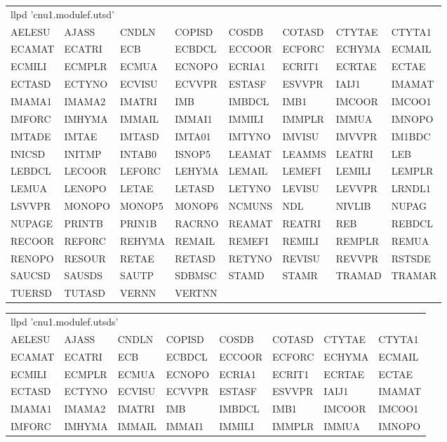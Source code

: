 {\tiny\ttfamily
\noindent\begin{tabular}{@{}llllllll@{}}
\multicolumn{8}{l}{llpd 'cnu1.modulef.utsd'}\\
AELESU & AJASS & CNDLN & COPISD & COSDB & COTASD & CTYTAE & CTYTA1\\
ECAMAT & ECATRI & ECB & ECBDCL & ECCOOR & ECFORC & ECHYMA & ECMAIL\\
ECMILI & ECMPLR & ECMUA & ECNOPO & ECRIA1 & ECRIT1 & ECRTAE & ECTAE\\
ECTASD & ECTYNO & ECVISU & ECVVPR & ESTASF & ESVVPR & IAIJ1 & IMAMAT\\
IMAMA1 & IMAMA2 & IMATRI & IMB & IMBDCL & IMB1 & IMCOOR & IMCOO1\\
IMFORC & IMHYMA & IMMAIL & IMMAI1 & IMMILI & IMMPLR & IMMUA & IMNOPO\\
IMTADE & IMTAE & IMTASD & IMTA01 & IMTYNO & IMVISU & IMVVPR & IM1BDC\\
INICSD & INITMP & INTAB0 & ISNOP5 & LEAMAT & LEAMMS & LEATRI & LEB\\
LEBDCL & LECOOR & LEFORC & LEHYMA & LEMAIL & LEMEFI & LEMILI & LEMPLR\\
LEMUA & LENOPO & LETAE & LETASD & LETYNO & LEVISU & LEVVPR & LRNDL1\\
LSVVPR & MONOPO & MONOP5 & MONOP6 & NCMUNS & NDL & NIVLIB & NUPAG\\
NUPAGE & PRINTB & PRIN1B & RACRNO & REAMAT & REATRI & REB & REBDCL\\
RECOOR & REFORC & REHYMA & REMAIL & REMEFI & REMILI & REMPLR & REMUA\\
RENOPO & RESOUR & RETAE & RETASD & RETYNO & REVISU & REVVPR & RSTSDE\\
SAUCSD & SAUSDS & SAUTP & SDBMSC & STAMD & STAMR & TRAMAD & TRAMAR\\
TUERSD & TUTASD & VERNN & VERTNN
\end{tabular}}


{\tiny\ttfamily
\noindent\begin{tabular}{@{}llllllll@{}}
\multicolumn{8}{l}{llpd 'cnu1.modulef.utsds'}\\
AELESU & AJASS & CNDLN & COPISD & COSDB & COTASD & CTYTAE & CTYTA1\\
ECAMAT & ECATRI & ECB & ECBDCL & ECCOOR & ECFORC & ECHYMA & ECMAIL\\
ECMILI & ECMPLR & ECMUA & ECNOPO & ECRIA1 & ECRIT1 & ECRTAE & ECTAE\\
ECTASD & ECTYNO & ECVISU & ECVVPR & ESTASF & ESVVPR & IAIJ1 & IMAMAT\\
IMAMA1 & IMAMA2 & IMATRI & IMB & IMBDCL & IMB1 & IMCOOR & IMCOO1\\
IMFORC & IMHYMA & IMMAIL & IMMAI1 & IMMILI & IMMPLR & IMMUA & IMNOPO
\end{tabular}}

